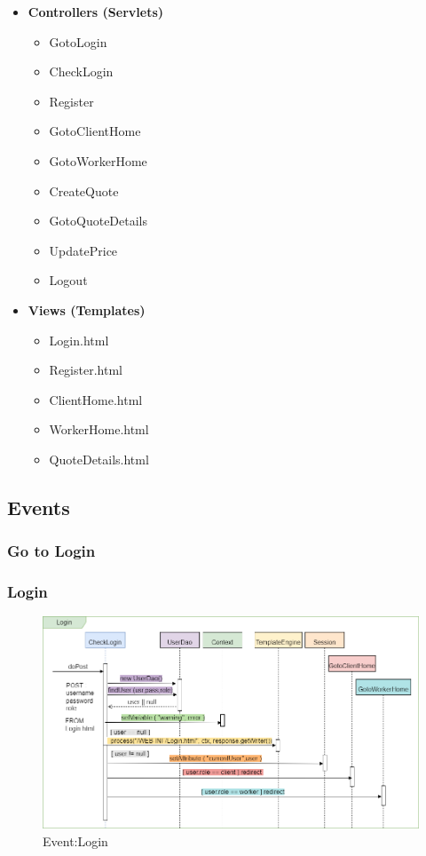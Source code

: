 \documentclass[a4paper, 12pt]{article}
\begin{document}
\begin{itemize}
\begin{itemize}
\begin{itemize}
	\end{itemize}
\end{itemize}
\item \textbf{Controllers (Servlets)}
\begin{itemize}
	\item GotoLogin
	\item CheckLogin
	\item Register
	\item GotoClientHome
	\item GotoWorkerHome
	\item CreateQuote
	\item GotoQuoteDetails
	\item UpdatePrice
	\item Logout
\end{itemize}
\item \textbf{Views (Templates)}
\begin{itemize}
\item Login.html
\item Register.html
\item ClientHome.html
\item WorkerHome.html
\item QuoteDetails.html
\end{itemize}
\end{itemize}
\subsection{Events}
\subsubsection{Go to Login}
\subsubsection{Login}
\begin{figure}[h!]
	\centering
	\includegraphics[width=1\textwidth]{PureHTML_images/Login.png}
	\caption{Event:Login}
	\label{figure:login_sd}
\end{figure}
\end{document}
